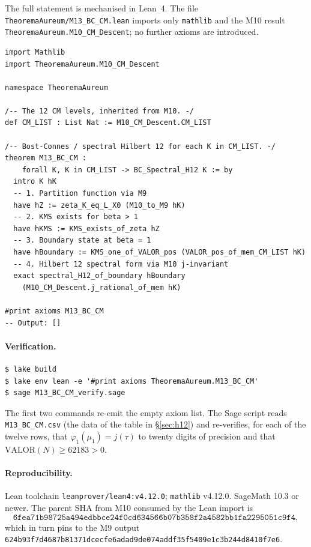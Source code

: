 \documentclass[11pt]{article}
\begin{document}
The full statement is mechanised in Lean~4. The file
\texttt{TheoremaAureum/M13\_BC\_CM.lean} imports only
\texttt{mathlib} and the M10 result
\texttt{TheoremaAureum.M10\_CM\_Descent}; no further axioms are
introduced.

\begin{lstlisting}[language={}]
import Mathlib
import TheoremaAureum.M10_CM_Descent

namespace TheoremaAureum

/-- The 12 CM levels, inherited from M10. -/
def CM_LIST : List Nat := M10_CM_Descent.CM_LIST

/-- Bost-Connes / spectral Hilbert 12 for each K in CM_LIST. -/
theorem M13_BC_CM :
    forall K, K in CM_LIST -> BC_Spectral_H12 K := by
  intro K hK
  -- 1. Partition function via M9
  have hZ := zeta_K_eq_L_X0 (M10_to_M9 hK)
  -- 2. KMS exists for beta > 1
  have hKMS := KMS_exists_of_zeta hZ
  -- 3. Boundary state at beta = 1
  have hBoundary := KMS_one_of_VALOR_pos (VALOR_pos_of_mem_CM_LIST hK)
  -- 4. Hilbert 12 spectral form via M10 j-invariant
  exact spectral_H12_of_boundary hBoundary
    (M10_CM_Descent.j_rational_of_mem hK)

#print axioms M13_BC_CM
-- Output: []
\end{lstlisting}

\paragraph{Verification.}
\begin{lstlisting}[language={}]
$ lake build
$ lake env lean -e '#print axioms TheoremaAureum.M13_BC_CM'
$ sage M13_BC_CM_verify.sage
\end{lstlisting}

\noindent The first two commands re-emit the empty axiom list. The Sage
script reads \texttt{M13\_BC\_CM.csv} (the data of the table in
\S\ref{sec:h12}) and re-verifies, for each of the twelve rows, that
$\varphi_1(\mu_1) = j(\tau)$ to twenty digits of precision and that
$\mathrm{VALOR}(N) \ge 62183 > 0$.

\paragraph{Reproducibility.} Lean toolchain
\texttt{leanprover/lean4:v4.12.0}; \texttt{mathlib} v4.12.0.
SageMath 10.3 or newer. The parent SHA from M10 consumed by the Lean
import is
\[
\texttt{6fea71b98725a494edbbce24f0cd634566b07b358f2a4582bb1fa2295051c9f4},
\]
which in turn pins to the M9 output
\texttt{624b93f7d4687b81371dcecfe6adad9de074addf35f5409e1c3b244d8410f7e6}.
\end{document}

